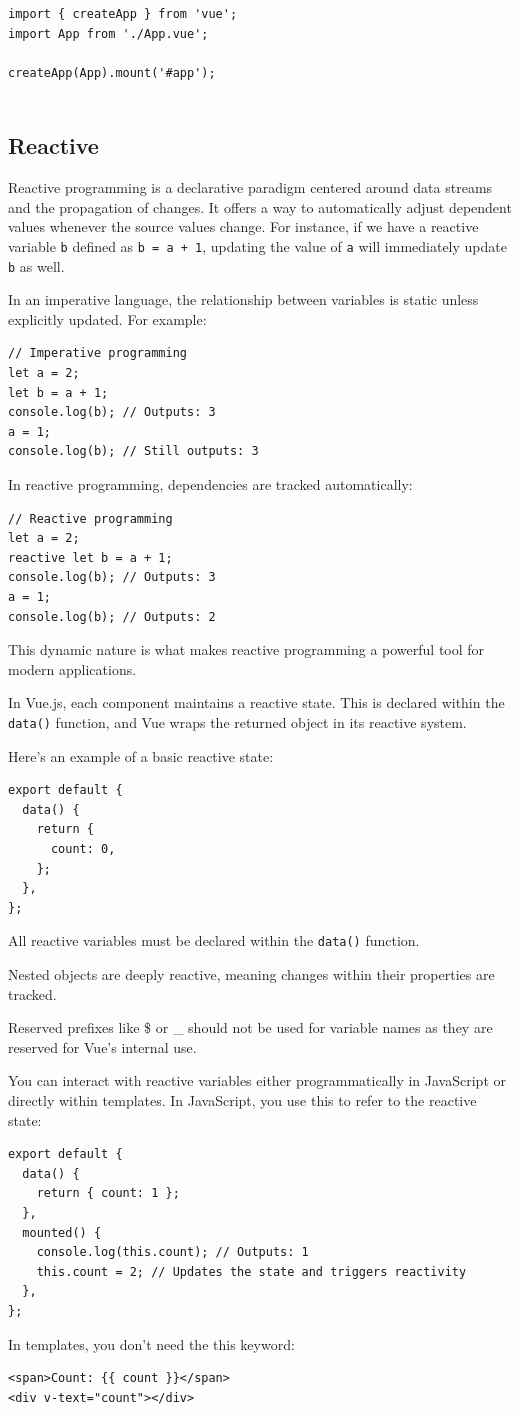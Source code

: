 \begin{verbatim}
import { createApp } from 'vue';
import App from './App.vue';

createApp(App).mount('#app');
    
\end{verbatim}

\subsection*{Reactive}
Reactive programming is a declarative paradigm centered around data streams and the propagation of changes. It offers a way to automatically adjust dependent values whenever the source values change. For instance, if we have a reactive variable \texttt{b} defined as \texttt{b = a + 1}, updating the value of \texttt{a} will immediately update \texttt{b} as well.

In an imperative language, the relationship between variables is static unless explicitly updated. For example:
\begin{verbatim}
// Imperative programming
let a = 2;
let b = a + 1;
console.log(b); // Outputs: 3
a = 1;
console.log(b); // Still outputs: 3
\end{verbatim}
In reactive programming, dependencies are tracked automatically:
\begin{verbatim}
// Reactive programming
let a = 2;
reactive let b = a + 1;
console.log(b); // Outputs: 3
a = 1;
console.log(b); // Outputs: 2
\end{verbatim}
This dynamic nature is what makes reactive programming a powerful tool for modern applications.

In Vue.js, each component maintains a reactive state. This is declared within the \texttt{data()} function, and Vue wraps the returned object in its reactive system.

Here’s an example of a basic reactive state:
\begin{verbatim}
export default {
  data() {
    return {
      count: 0,
    };
  },
};
\end{verbatim}
All reactive variables must be declared within the \texttt{data()} function.

Nested objects are deeply reactive, meaning changes within their properties are tracked.

Reserved prefixes like \$ or \_ should not be used for variable names as they are reserved for Vue's internal use.

You can interact with reactive variables either programmatically in JavaScript or directly within templates. In JavaScript, you use this to refer to the reactive state:
\begin{verbatim}
export default {
  data() {
    return { count: 1 };
  },
  mounted() {
    console.log(this.count); // Outputs: 1
    this.count = 2; // Updates the state and triggers reactivity
  },
};
\end{verbatim}
In templates, you don’t need the this keyword:
\begin{verbatim}
<span>Count: {{ count }}</span>
<div v-text="count"></div>
\end{verbatim}

